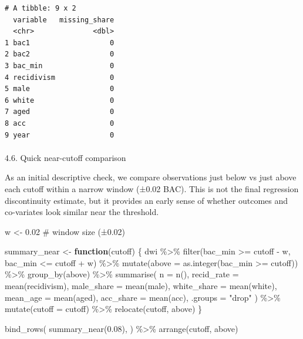 \documentclass[
  letterpaper,
  DIV=11,
  numbers=noendperiod]{scrartcl}
\makeatletter
\let\oldparagraph\paragraph
\renewcommand{\paragraph}{
    \@ifstar
      \xxxParagraphStar
      \xxxParagraphNoStar
  }
\newcommand{\xxxParagraphStar}[1]{\oldparagraph*{#1}\mbox{}}
\newcommand{\xxxParagraphNoStar}[1]{\oldparagraph{#1}\mbox{}}
\newenvironment{Shaded}{\begin{snugshade}}{\end{snugshade}}
\newcommand{\AttributeTok}[1]{\textcolor[rgb]{0.40,0.45,0.13}{#1}}
\newcommand{\CommentTok}[1]{\textcolor[rgb]{0.37,0.37,0.37}{#1}}
\newcommand{\ControlFlowTok}[1]{\textcolor[rgb]{0.00,0.23,0.31}{\textbf{#1}}}
\newcommand{\FloatTok}[1]{\textcolor[rgb]{0.68,0.00,0.00}{#1}}
\newcommand{\FunctionTok}[1]{\textcolor[rgb]{0.28,0.35,0.67}{#1}}
\newcommand{\NormalTok}[1]{\textcolor[rgb]{0.00,0.23,0.31}{#1}}
\newcommand{\OtherTok}[1]{\textcolor[rgb]{0.00,0.23,0.31}{#1}}
\newcommand{\SpecialCharTok}[1]{\textcolor[rgb]{0.37,0.37,0.37}{#1}}
\newcommand{\StringTok}[1]{\textcolor[rgb]{0.13,0.47,0.30}{#1}}
\makeatother
\begin{document}
\begin{verbatim}
# A tibble: 9 x 2
  variable   missing_share
  <chr>              <dbl>
1 bac1                   0
2 bac2                   0
3 bac_min                0
4 recidivism             0
5 male                   0
6 white                  0
7 aged                   0
8 acc                    0
9 year                   0
\end{verbatim}

\paragraph{4.6. Quick near-cutoff
comparison}\label{quick-near-cutoff-comparison}

As an initial descriptive check, we compare observations just below vs
just above each cutoff within a narrow window (±0.02 BAC). This is not
the final regression discontinuity estimate, but it provides an early
sense of whether outcomes and co-variates look similar near the
threshold.

\begin{Shaded}
\begin{Highlighting}[]
\NormalTok{w }\OtherTok{\textless{}{-}} \FloatTok{0.02}  \CommentTok{\# window size (±0.02)}

\NormalTok{summary\_near }\OtherTok{\textless{}{-}} \ControlFlowTok{function}\NormalTok{(cutoff) \{}
\NormalTok{  dwi }\SpecialCharTok{\%\textgreater{}\%}
    \FunctionTok{filter}\NormalTok{(bac\_min }\SpecialCharTok{\textgreater{}=}\NormalTok{ cutoff }\SpecialCharTok{{-}}\NormalTok{ w, bac\_min }\SpecialCharTok{\textless{}=}\NormalTok{ cutoff }\SpecialCharTok{+}\NormalTok{ w) }\SpecialCharTok{\%\textgreater{}\%}
    \FunctionTok{mutate}\NormalTok{(}\AttributeTok{above =} \FunctionTok{as.integer}\NormalTok{(bac\_min }\SpecialCharTok{\textgreater{}=}\NormalTok{ cutoff)) }\SpecialCharTok{\%\textgreater{}\%}
    \FunctionTok{group\_by}\NormalTok{(above) }\SpecialCharTok{\%\textgreater{}\%}
    \FunctionTok{summarise}\NormalTok{(}
      \AttributeTok{n =} \FunctionTok{n}\NormalTok{(),}
      \AttributeTok{recid\_rate =} \FunctionTok{mean}\NormalTok{(recidivism),}
      \AttributeTok{male\_share =} \FunctionTok{mean}\NormalTok{(male),}
      \AttributeTok{white\_share =} \FunctionTok{mean}\NormalTok{(white),}
      \AttributeTok{mean\_age =} \FunctionTok{mean}\NormalTok{(aged),}
      \AttributeTok{acc\_share =} \FunctionTok{mean}\NormalTok{(acc),}
      \AttributeTok{.groups =} \StringTok{"drop"}
\NormalTok{    ) }\SpecialCharTok{\%\textgreater{}\%}
    \FunctionTok{mutate}\NormalTok{(}\AttributeTok{cutoff =}\NormalTok{ cutoff) }\SpecialCharTok{\%\textgreater{}\%}
    \FunctionTok{relocate}\NormalTok{(cutoff, above)}
\NormalTok{\}}

\FunctionTok{bind\_rows}\NormalTok{(}
  \FunctionTok{summary\_near}\NormalTok{(}\FloatTok{0.08}\NormalTok{),}
\NormalTok{) }\SpecialCharTok{\%\textgreater{}\%}
  \FunctionTok{arrange}\NormalTok{(cutoff, above)}
\end{Highlighting}
\end{Shaded}
\end{document}

